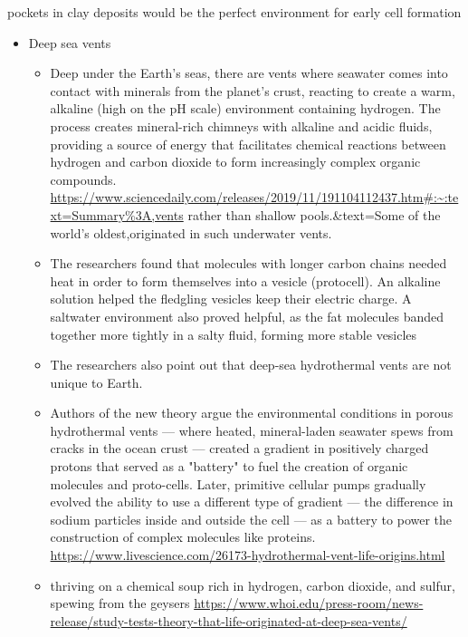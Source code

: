 \documentclass[letterpaper]{article}
\begin{document}
pockets in clay deposits would be the perfect environment for early cell
formation

\begin{itemize}
\item Deep sea vents

\begin{itemize}
\item Deep under the Earth's seas, there are vents where seawater comes
into contact with minerals from the planet's crust, reacting to
create a warm, alkaline (high on the pH scale) environment
containing hydrogen. The process creates mineral-rich chimneys with
alkaline and acidic fluids, providing a source of energy that
facilitates chemical reactions between hydrogen and carbon dioxide
to form increasingly complex organic compounds.
\url{https://www.sciencedaily.com/releases/2019/11/191104112437.htm\#:\~:text=Summary\%3A,vents}
rather than shallow pools.\&text=Some of the world's
oldest,originated in such underwater vents.
\item The researchers found that molecules with longer carbon chains
needed heat in order to form themselves into a vesicle (protocell).
An alkaline solution helped the fledgling vesicles keep their
electric charge. A saltwater environment also proved helpful, as the
fat molecules banded together more tightly in a salty fluid, forming
more stable vesicles
\item The researchers also point out that deep-sea hydrothermal vents are
not unique to Earth.
\item Authors of the new theory argue the environmental conditions in
porous hydrothermal vents --- where heated, mineral-laden seawater
spews from cracks in the ocean crust --- created a gradient in
positively charged protons that served as a "battery" to fuel the
creation of organic molecules and proto-cells. Later, primitive
cellular pumps gradually evolved the ability to use a different type
of gradient --- the difference in sodium particles inside and
outside the cell --- as a battery to power the construction of
complex molecules like proteins.
\url{https://www.livescience.com/26173-hydrothermal-vent-life-origins.html}
\item thriving on a chemical soup rich in hydrogen, carbon dioxide, and
sulfur, spewing from the geysers
\url{https://www.whoi.edu/press-room/news-release/study-tests-theory-that-life-originated-at-deep-sea-vents/}
\end{itemize}
\end{itemize}
\end{document}
